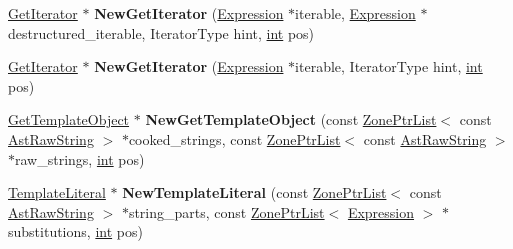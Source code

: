 \begin{DoxyCompactItemize}
\mbox{\label{classv8_1_1internal_1_1AstNodeFactory_a8ebc65a990a5660ab5202835d0e8b370}} 
\mbox{\hyperlink{classv8_1_1internal_1_1GetIterator}{Get\+Iterator}} $\ast$ {\bfseries New\+Get\+Iterator} (\mbox{\hyperlink{classv8_1_1internal_1_1Expression}{Expression}} $\ast$iterable, \mbox{\hyperlink{classv8_1_1internal_1_1Expression}{Expression}} $\ast$destructured\+\_\+iterable, Iterator\+Type hint, \mbox{\hyperlink{classint}{int}} pos)
\item 
\mbox{\label{classv8_1_1internal_1_1AstNodeFactory_a0b9d17a585382c68edc4137d5630414a}} 
\mbox{\hyperlink{classv8_1_1internal_1_1GetIterator}{Get\+Iterator}} $\ast$ {\bfseries New\+Get\+Iterator} (\mbox{\hyperlink{classv8_1_1internal_1_1Expression}{Expression}} $\ast$iterable, Iterator\+Type hint, \mbox{\hyperlink{classint}{int}} pos)
\item 
\mbox{\label{classv8_1_1internal_1_1AstNodeFactory_ac19f8d1b3431706f9ab54105b9a4cb6a}} 
\mbox{\hyperlink{classv8_1_1internal_1_1GetTemplateObject}{Get\+Template\+Object}} $\ast$ {\bfseries New\+Get\+Template\+Object} (const \mbox{\hyperlink{classv8_1_1internal_1_1ZoneList}{Zone\+Ptr\+List}}$<$ const \mbox{\hyperlink{classv8_1_1internal_1_1AstRawString}{Ast\+Raw\+String}} $>$ $\ast$cooked\+\_\+strings, const \mbox{\hyperlink{classv8_1_1internal_1_1ZoneList}{Zone\+Ptr\+List}}$<$ const \mbox{\hyperlink{classv8_1_1internal_1_1AstRawString}{Ast\+Raw\+String}} $>$ $\ast$raw\+\_\+strings, \mbox{\hyperlink{classint}{int}} pos)
\item 
\mbox{\label{classv8_1_1internal_1_1AstNodeFactory_a7219a4ba241861730ab8ac416df91fff}} 
\mbox{\hyperlink{classv8_1_1internal_1_1TemplateLiteral}{Template\+Literal}} $\ast$ {\bfseries New\+Template\+Literal} (const \mbox{\hyperlink{classv8_1_1internal_1_1ZoneList}{Zone\+Ptr\+List}}$<$ const \mbox{\hyperlink{classv8_1_1internal_1_1AstRawString}{Ast\+Raw\+String}} $>$ $\ast$string\+\_\+parts, const \mbox{\hyperlink{classv8_1_1internal_1_1ZoneList}{Zone\+Ptr\+List}}$<$ \mbox{\hyperlink{classv8_1_1internal_1_1Expression}{Expression}} $>$ $\ast$substitutions, \mbox{\hyperlink{classint}{int}} pos)
\item 
\mbox{\label{classv8_1_1internal_1_1AstNodeFactory_a9bd81c94cea81e688718ab9e049861bf}} 

\end{DoxyCompactItemize}

